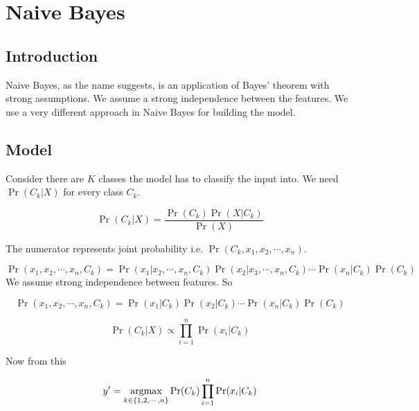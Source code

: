 
\chapter{Naive Bayes}
\label{chp:bayes}

\section{Introduction}
Naive Bayes, as the name suggests, is an application of Bayes' theorem with strong assumptions.
We assume a strong independence between the features. We use a very different approach
in Naive Bayes for building the model.

\section{Model}
Consider there are $K$ classes the model has to classify the input into.
We need $\Pr{(C_k | X)}$ for every class $C_k$.

\begin{equation}
    \Pr (C_k | X) = \frac{\Pr (C_k) \Pr (X|C_k)}{\Pr (X)}
\end{equation}

The numerator represents joint probability i.e. $ \Pr (C_k,x_1,x_2, \cdots ,x_n) $.

\begin{equation}
    \Pr (x_1,x_2, \cdots ,x_n,C_k) = \Pr (x_1|x_2, \cdots ,x_n,C_k)\Pr (x_2|x_3, \cdots ,x_n,C_k) \cdots \Pr (x_n|C_k) \Pr (C_k)
\end{equation}
We assume strong independence between features. So

\begin{equation}
    \Pr (x_1,x_2, \cdots ,x_n,C_k) = \Pr(x_1|C_k) \Pr(x_2|C_k) \cdots \Pr(x_n|C_k) \Pr(C_k)
\end{equation}

\begin{equation}
    \Pr (C_k | X) \propto \prod_{i=1}^{n} \Pr (x_i|C_k) 
\end{equation}

Now from this

\begin{equation}
    y' = \operatorname*{argmax}_{k \in \{1,2, \cdots ,n\}} \Pr(C_k) \prod_{i=1}^{n} \Pr(x_i|C_k)
\end{equation}